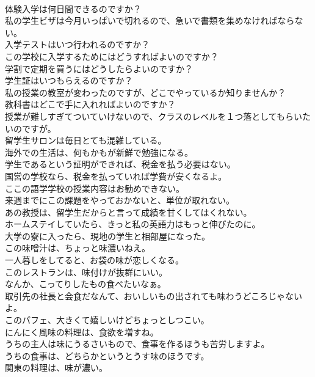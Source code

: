 \documentclass[8pt]{extreport}
\begin{document}
\begin{CJK}{UTF8}{min}
\\	体験入学は何日間できるのですか？	
\\	私の学生ビザは今月いっぱいで切れるので、急いで書類を集めなければならない。	
\\	入学テストはいつ行われるのですか？	
\\	この学校に入学するためにはどうすればよいのですか？	
\\	学割で定期を買うにはどうしたらよいのですか？	
\\	学生証はいつもらえるのですか？	
\\	私の授業の教室が変わったのですが、どこでやっているか知りませんか？	
\\	教科書はどこで手に入れればよいのですか？	
\\	授業が難しすぎてついていけないので、クラスのレベルを１つ落としてもらいたいのですが。	
\\	留学生サロンは毎日とても混雑している。	
\\	海外での生活は、何もかもが新鮮で勉強になる。	
\\	学生であるという証明ができれば、税金を払う必要はない。	
\\	国営の学校なら、税金を払っていれば学費が安くなるよ。	
\\	ここの語学学校の授業内容はお勧めできない。	
\\	来週までにこの課題をやっておかないと、単位が取れない。	
\\	あの教授は、留学生だからと言って成績を甘くしてはくれない。	
\\	ホームステイしていたら、きっと私の英語力はもっと伸びたのに。	
\\	大学の寮に入ったら、現地の学生と相部屋になった。	
\\	この味噌汁は、ちょっと味濃いねえ。	
\\	一人暮しをしてると、お袋の味が恋しくなる。	
\\	このレストランは、味付けが抜群にいい。	
\\	なんか、こってりしたもの食べたいなぁ。	
\\	取引先の社長と会食だなんて、おいしいもの出されても味わうどころじゃないよ。	
\\	このパフェ、大きくて嬉しいけどちょっとしつこい。	
\\	にんにく風味の料理は、食欲を増すね。	
\\	うちの主人は味にうるさいもので、食事を作るほうも苦労しますよ。	
\\	うちの食事は、どちらかというとうす味のほうです。	
\\	関東の料理は、味が濃い。	

\end{CJK}
\end{document}
